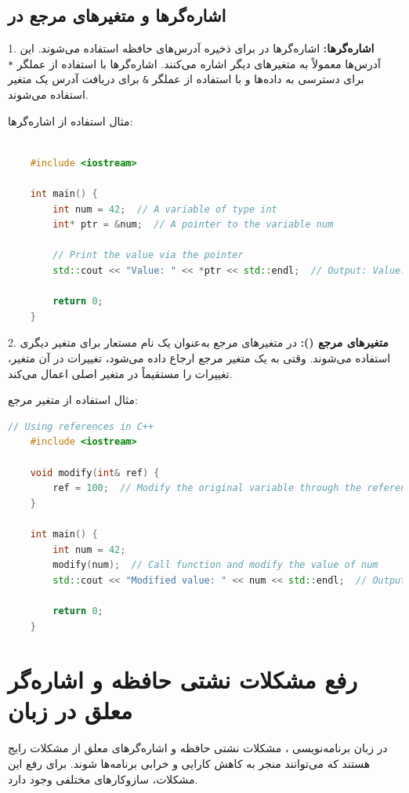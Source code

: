 \documentclass[12pt, a4paper]{report}
\begin{document}
\subsection{اشاره‌گرها و متغیرهای مرجع در }


1. \textbf{اشاره‌گرها:} 
اشاره‌گرها در  برای ذخیره آدرس‌های حافظه استفاده می‌شوند. این آدرس‌ها معمولاً به متغیرهای دیگر اشاره می‌کنند. اشاره‌گرها با استفاده از عملگر \texttt{*} برای دسترسی به داده‌ها و با استفاده از عملگر \texttt{\&} برای دریافت آدرس یک متغیر استفاده می‌شوند.

مثال استفاده از اشاره‌گرها:
\LTR
\begin{lstlisting}[language=C++, breaklines=true]

	#include <iostream>
	
	int main() {
		int num = 42;  // A variable of type int
		int* ptr = &num;  // A pointer to the variable num
		
		// Print the value via the pointer
		std::cout << "Value: " << *ptr << std::endl;  // Output: Value: 42
		
		return 0;
	}
\end{lstlisting}
\RTL

2. \textbf{متغیرهای مرجع ():} 
در  متغیرهای مرجع به‌عنوان یک نام مستعار برای متغیر دیگری استفاده می‌شوند. وقتی به یک متغیر مرجع ارجاع داده می‌شود، تغییرات در آن متغیر، تغییرات را مستقیماً در متغیر اصلی اعمال می‌کند.

مثال استفاده از متغیر مرجع:
\LTR
\begin{lstlisting}[language=C++, breaklines=true]
// Using references in C++
	#include <iostream>
	
	void modify(int& ref) {
		ref = 100;  // Modify the original variable through the reference
	}
	
	int main() {
		int num = 42;
		modify(num);  // Call function and modify the value of num
		std::cout << "Modified value: " << num << std::endl;  // Output: Modified value: 100
		
		return 0;
	}
\end{lstlisting}
\RTL

\section{رفع مشکلات نشتی حافظه و اشاره‌گر معلق در زبان }

در زبان برنامه‌نویسی ، مشکلات نشتی حافظه و اشاره‌گرهای معلق از مشکلات رایج هستند که می‌توانند منجر به کاهش کارایی و خرابی برنامه‌ها شوند. برای رفع این مشکلات، سازوکارهای مختلفی وجود دارد.
\end{document}
